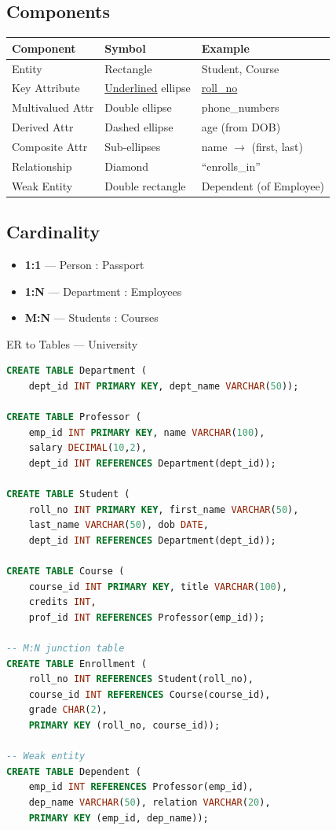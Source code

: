 \documentclass[12pt,a4paper]{article}
\begin{document}
\subsection{Components}
\begin{center}
\begin{tabular}{@{}l l l@{}}
\toprule
\textbf{Component} & \textbf{Symbol} & \textbf{Example} \\
\midrule
Entity & Rectangle & Student, Course \\
Key Attribute & \underline{Underlined} ellipse & \underline{roll\_no} \\
Multivalued Attr & Double ellipse & phone\_numbers \\
Derived Attr & Dashed ellipse & age (from DOB) \\
Composite Attr & Sub-ellipses & name $\to$ (first, last) \\
Relationship & Diamond & ``enrolls\_in'' \\
Weak Entity & Double rectangle & Dependent (of Employee) \\
\bottomrule
\end{tabular}
\end{center}

\subsection{Cardinality}
\begin{itemize}[leftmargin=*]
    \item \textbf{1:1} --- Person : Passport
    \item \textbf{1:N} --- Department : Employees
    \item \textbf{M:N} --- Students : Courses
\end{itemize}

\begin{examplebox}{ER to Tables --- University}
\begin{lstlisting}[language=SQL]
CREATE TABLE Department (
    dept_id INT PRIMARY KEY, dept_name VARCHAR(50));

CREATE TABLE Professor (
    emp_id INT PRIMARY KEY, name VARCHAR(100),
    salary DECIMAL(10,2),
    dept_id INT REFERENCES Department(dept_id));

CREATE TABLE Student (
    roll_no INT PRIMARY KEY, first_name VARCHAR(50),
    last_name VARCHAR(50), dob DATE,
    dept_id INT REFERENCES Department(dept_id));

CREATE TABLE Course (
    course_id INT PRIMARY KEY, title VARCHAR(100),
    credits INT,
    prof_id INT REFERENCES Professor(emp_id));

-- M:N junction table
CREATE TABLE Enrollment (
    roll_no INT REFERENCES Student(roll_no),
    course_id INT REFERENCES Course(course_id),
    grade CHAR(2),
    PRIMARY KEY (roll_no, course_id));

-- Weak entity
CREATE TABLE Dependent (
    emp_id INT REFERENCES Professor(emp_id),
    dep_name VARCHAR(50), relation VARCHAR(20),
    PRIMARY KEY (emp_id, dep_name));
\end{lstlisting}
\end{examplebox}
\end{document}
